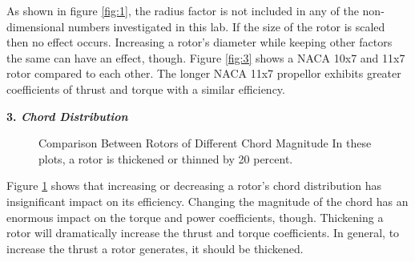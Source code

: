 \documentclass{article}
\begin{document}
As shown in figure \ref{fig:1}, the radius factor is not included in any of the non-dimensional numbers investigated in this lab. If the size of the rotor is scaled then no effect occurs. Increasing a rotor's diameter while keeping other factors the same can have an effect, though. Figure \ref{fig:3} shows a NACA 10x7 and 11x7 rotor compared to each other. The longer NACA 11x7 propellor exhibits greater coefficients of thrust and torque with a similar efficiency. \newline

\textbf{3. \emph{Chord Distribution}} \newline

\begin{figure}
  \centering
  \caption{Comparison Between Rotors of Different Chord Magnitude \newline In these plots, a rotor is thickened or thinned by 20 percent.}
  \label{fig:4}
\end{figure}

Figure \ref{fig:4} shows that increasing or decreasing a rotor's chord distribution has insignificant impact on its efficiency. Changing the magnitude of the chord has an enormous impact on the torque and power coefficients, though. Thickening a rotor will dramatically increase the thrust and torque coefficients. In general, to increase the thrust a rotor generates, it should be thickened. \newline
\end{document}

